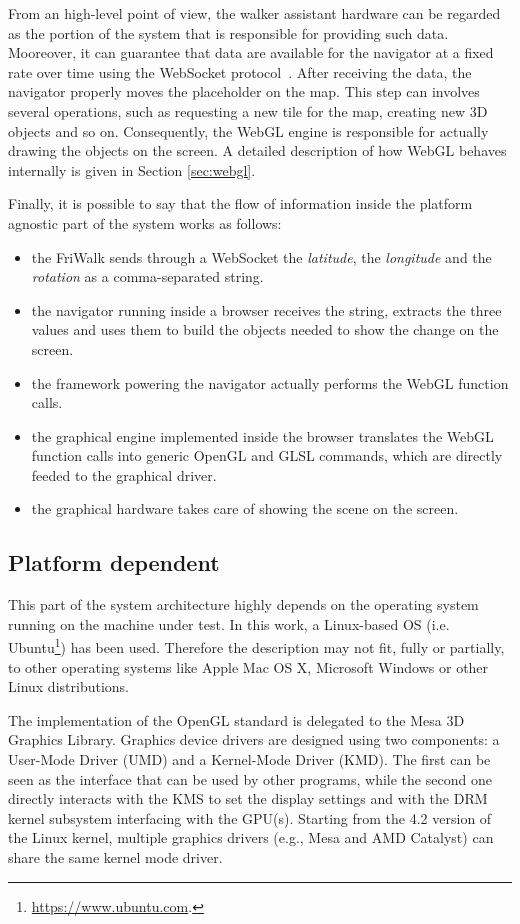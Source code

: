 From an high-level point of view, the walker assistant hardware can be regarded
as the portion of the system that is responsible for providing such data. Mooreover,
it can guarantee that data are available for the navigator at a fixed rate over
time using the WebSocket protocol~\cite{fette2011websocket}.
After receiving the data, the navigator properly moves the placeholder on the map.
This step can involves several operations, such as requesting a new tile for the
map, creating new 3D objects and so on. Consequently, the WebGL engine is responsible
for actually drawing the objects on the screen. A detailed description of how WebGL
behaves internally is given in Section \ref{sec:webgl}.

Finally, it is possible to say that the flow of information inside the platform
agnostic part of the system works as follows:
\begin{itemize}
    \item the FriWalk sends through a WebSocket the \emph{latitude}, the
        \emph{longitude} and the \emph{rotation} as a comma-separated string.
    \item the navigator running inside a browser receives the string, extracts
        the three values and uses them to build the objects needed to show the
        change on the screen.
    \item the framework powering the navigator actually performs the
        WebGL function calls.
    \item the graphical engine implemented inside the browser translates the WebGL
        function calls into generic OpenGL and GLSL commands, which are directly
        feeded to the graphical driver.
    \item the graphical hardware takes care of showing the scene on the screen.
\end{itemize}


\subsection{Platform dependent} \label{sec:platform_dependent}
This part of the system architecture highly depends on the operating system
running on the machine under test. In this work, a Linux-based OS (i.e.
Ubuntu\footnote{\url{https://www.ubuntu.com}.})
has been used. Therefore the description may not fit, fully or partially, to
other operating systems like Apple Mac OS X, Microsoft Windows or other Linux
distributions.

The implementation of the OpenGL standard is delegated to the Mesa 3D Graphics Library.
Graphics device drivers are designed using two components: a User-Mode Driver
(UMD) and a Kernel-Mode Driver (KMD). The first can be seen as the interface
that can be used by other programs, while the second one directly interacts
with the KMS to set the display settings and with the DRM kernel subsystem
interfacing with the GPU(s). Starting from the 4.2 version of the Linux kernel,
multiple graphics drivers (e.g., Mesa and AMD Catalyst) can share the same kernel
mode driver.


